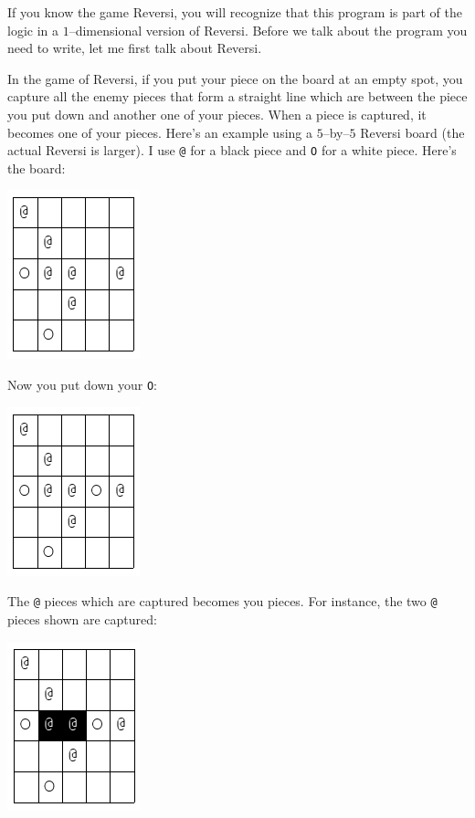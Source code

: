 If you know the game Reversi, you will recognize that this program is part of
the logic in a $1$--dimensional version of Reversi. Before we talk about the
program you need to write, let me first talk about Reversi.

In the game of Reversi, if you put your piece on the board at an empty spot,
you capture all the enemy pieces that form a straight line which are between
the piece you put down and another one of your pieces. When a piece is
captured, it becomes one of your pieces. Here's an example using a $5$--by--$5$
Reversi board (the actual Reversi is larger). I use \verb!@! for a black piece
and \verb!O! for a white piece. Here's the board:

\includegraphics[scale=0.5]{../a11/a11q04/question/pic1.png}

Now you put down your \verb!O!:

\includegraphics[scale=0.5]{../a11/a11q04/question/pic2.png}

The \verb!@! pieces which are captured becomes you pieces. For instance, the
two \verb!@! pieces shown are captured:

\includegraphics[scale=0.5]{../a11/a11q04/question/pic3.png}

